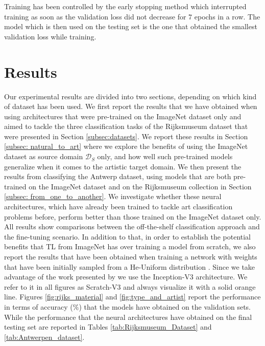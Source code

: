 Training has been controlled by the early stopping method \cite{caruana2001overfitting} which interrupted training as soon as the validation loss did not decrease for $7$ epochs in a row. The model which is then used on the testing set is the one that obtained the smallest validation loss while training.


\section{Results}
\label{sec:ch_4_results}

Our experimental results are divided into two sections, depending on which kind of dataset has been used. We first report the results that we have obtained when using architectures that were pre-trained on the ImageNet dataset only and aimed to tackle the three classification tasks of the Rijksmuseum dataset that were presented in Section \ref{subsec:datasets}. We report these results in Section \ref{subsec: natural_to_art} where we explore the benefits of using the ImageNet dataset as source domain $\mathcal{D}_S$ only, and how well such pre-trained models generalize when it comes to the artistic target domain. We then present the results from classifying the Antwerp dataset, using models that are both pre-trained on the ImageNet dataset and on the Rijksmuseum collection in Section \ref{subsec: from_one_to_another}. We investigate whether these neural architectures, which have already been trained to tackle art classification problems before, perform better than those trained on the ImageNet dataset only.    
All results show comparisons between the off-the-shelf classification approach and the fine-tuning scenario. In addition to that, in order to establish the potential benefits that TL from ImageNet has over training a model from scratch, we also report the results that have been obtained when training a network with weights that have been initially sampled from a He-Uniform distribution \cite{he2015delving}. Since we take advantage of the work presented by \citet{bidoiadeep} we use the Inception-V3 architecture. We refer to it in all figures as Scratch-V3 and always visualize it with a solid orange line. Figures \ref{fig:rijks_material} and \ref{fig:type_and_artist} report the performance in terms of accuracy ($\%$) that the models have obtained on the validation sets. While the performance that the neural architectures have obtained on the final testing set are reported in Tables \ref{tab:Rijksmuseum_Dataset} and \ref{tab:Antwerpen_dataset}. 


